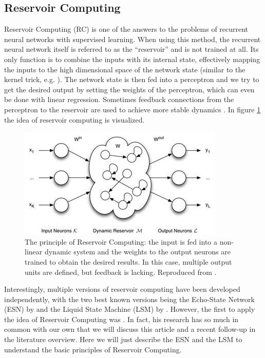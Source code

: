 \documentclass[10pt,a4paper]{report}
\begin{document}
\subsection*{Reservoir Computing}
Reservoir Computing (RC) is one of the answers to the problems of recurrent neural networks with supervised learning. When using this method, the recurrent neural network itself is referred to as the ``reservoir'' and is not trained at all. Its only function is to combine the inputs with its internal state, effectively mapping the inputs to the high dimensional space of the network state (similar to the kernel trick, e.g. \citet{Baudat2001}). The network state is then fed into a perceptron and we try to get the desired output by setting the weights of the perceptron, which can even be done with linear regression. Sometimes feedback connections from the perceptron to the reservoir are used to achieve more stable dynamics \citep{Lukovsevivcius2009}. In figure \ref{ReservoirComputing} the idea of reservoir computing is visualized. 

\begin{figure}[bthp]
\begin{center}
\includegraphics[scale=0.6]{figures/reservoir.jpeg}
\caption{The principle of Reservoir Computing: the input is fed into a non-linear dynamic system and the weights to the output neurons are trained to obtain the desired results. In this case, multiple output units are defined, but feedback is lacking. Reproduced from \citet{Oubbati2010}. }
\label{ReservoirComputing}
\end{center}
\end{figure}

Interestingly, multiple versions of reservoir computing have been developed independently, with the two best known versions being the Echo-State Network (ESN) by \citet{Jaeger2001} and the Liquid State Machine (LSM) by \citet{Maass2002}. However, the first to apply the idea of Reservoir Computing was \citet{Dominey1995}. In fact, his research has so much in common with our own that we will discuss this article and a recent follow-up \citep{Hinaut2011} in the literature overview. Here we will just describe the ESN and the LSM to understand the basic principles of Reservoir Computing.
\end{document}
